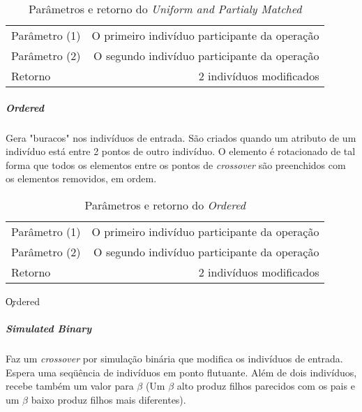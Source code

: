 \begin{table}[!h]
  \begin{center}
  \begin{tabular}{|l|r|}
    \hline
    Parâmetro (1) & O primeiro indivíduo participante da operação \\
    Parâmetro (2) & O segundo indivíduo participante da operação \\
    Retorno & 2 indivíduos modificados\\
    \hline    
  \end{tabular}
  \end{center}
  \caption{Parâmetros e retorno do {\it Uniform and Partialy Matched}}
  \label{Uniform and Partially Matched}
\end{table}

\subparagraph{Ordered}
Gera "buracos" nos indivíduos de entrada. São criados quando um atributo de um indivíduo está entre 2 pontos de outro indivíduo. O elemento é rotacionado de tal forma que todos os elementos entre os pontos de {\it crossover} são preenchidos com os elementos removidos, em ordem.\\

\begin{table}[!h]
  \begin{center}
  \begin{tabular}{|l|r|}
    \hline
    Parâmetro (1) & O primeiro indivíduo participante da operação \\
    Parâmetro (2) & O segundo indivíduo participante da operação \\
    Retorno & 2 indivíduos modificados\\
    \hline    
  \end{tabular}
  \end{center}
  \caption{Parâmetros e retorno do {\it Ordered}}
  \c{Ordered}
\end{table}

\subparagraph{Simulated Binary}
Faz um {\it crossover} por simulação binária que modifica os indivíduos de entrada. Espera uma seqüência de indivíduos em ponto flutuante. Além de dois indivíduos, recebe também um valor para $\beta$ (Um $\beta$ alto produz filhos parecidos com os pais e um $\beta$ baixo produz filhos mais diferentes).\\


